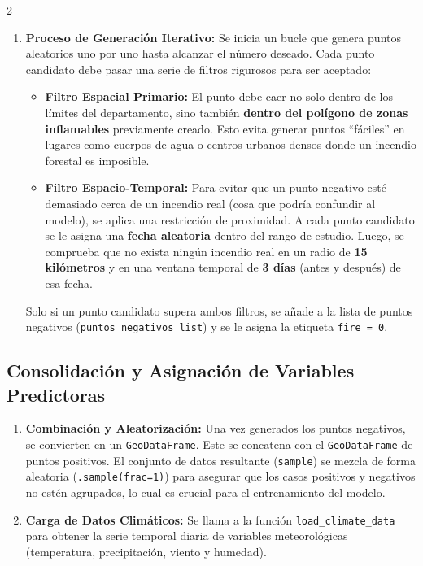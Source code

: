 \documentclass[a4paper,10pt]{article}
\begin{document}
\begin{multicols}{2}
\begin{enumerate}
    \item \textbf{Proceso de Generación Iterativo:} Se inicia un bucle que genera puntos aleatorios uno por uno hasta alcanzar el número deseado. Cada punto candidato debe pasar una serie de filtros rigurosos para ser aceptado:

    \begin{itemize}
        \item \textbf{Filtro Espacial Primario:} El punto debe caer no solo dentro de los límites del departamento, sino también \textbf{dentro del polígono de zonas inflamables} previamente creado. Esto evita generar puntos ``fáciles'' en lugares como cuerpos de agua o centros urbanos densos donde un incendio forestal es imposible.

        \item \textbf{Filtro Espacio-Temporal:} Para evitar que un punto negativo esté demasiado cerca de un incendio real (cosa que podría confundir al modelo), se aplica una restricción de proximidad. A cada punto candidato se le asigna una \textbf{fecha aleatoria} dentro del rango de estudio. Luego, se comprueba que no exista ningún incendio real en un radio de \textbf{15 kilómetros} y en una ventana temporal de \textbf{3 días} (antes y después) de esa fecha.
    \end{itemize}

    Solo si un punto candidato supera ambos filtros, se añade a la lista de puntos negativos (\texttt{puntos\_negativos\_list}) y se le asigna la etiqueta \texttt{fire = 0}.
\end{enumerate}

\subsection{Consolidación y Asignación de Variables Predictoras}

\begin{enumerate}
    \item \textbf{Combinación y Aleatorización:} Una vez generados los puntos negativos, se convierten en un \texttt{GeoDataFrame}. Este se concatena con el \texttt{GeoDataFrame} de puntos positivos. El conjunto de datos resultante (\texttt{sample}) se mezcla de forma aleatoria (\texttt{.sample(frac=1)}) para asegurar que los casos positivos y negativos no estén agrupados, lo cual es crucial para el entrenamiento del modelo.

    \item \textbf{Carga de Datos Climáticos:} Se llama a la función \texttt{load\_climate\_data} para obtener la serie temporal diaria de variables meteorológicas (temperatura, precipitación, viento y humedad).


\end{enumerate}
\end{multicols}
\end{document}
